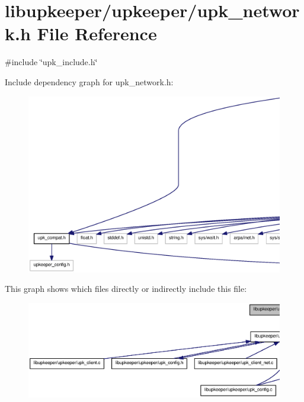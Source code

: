 \section{libupkeeper/upkeeper/upk\_\-network.h File Reference}
\label{upk__network_8h}
{\ttfamily \#include \char`\"{}upk\_\-include.h\char`\"{}}\par
Include dependency graph for upk\_\-network.h:
\nopagebreak
\begin{figure}[H]
\begin{center}
\leavevmode
\includegraphics[width=400pt]{upk__network_8h__incl}
\end{center}
\end{figure}
This graph shows which files directly or indirectly include this file:\nopagebreak
\begin{figure}[H]
\begin{center}
\leavevmode
\includegraphics[width=400pt]{upk__network_8h__dep__incl}
\end{center}
\end{figure}
